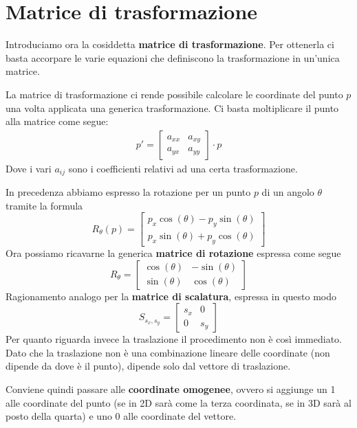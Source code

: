 \section{Matrice di trasformazione}
Introduciamo ora la cosiddetta \textbf{matrice di trasformazione}. Per ottenerla ci basta accorpare le varie equazioni
che definiscono la trasformazione in un'unica matrice.

La matrice di trasformazione ci rende possibile calcolare le coordinate del punto $p$ una volta applicata una generica
trasformazione. Ci basta moltiplicare il punto alla matrice come segue:
\begin{gather*}
	p' = \begin{bmatrix}
		a_{xx} & a_{xy} \\
		a_{yx} & a_{yy}
	\end{bmatrix} \cdot p
\end{gather*}
Dove i vari $a_{ij}$ sono i coefficienti relativi ad una certa trasformazione.

In precedenza abbiamo espresso la rotazione per un punto $p$ di un angolo $\theta$ tramite la formula
\[
	R_\theta(p) = \begin{bmatrix}
		p_x \cos(\theta) - p_y \sin(\theta) \\
		p_x \sin(\theta) + p_y \cos(\theta)
	\end{bmatrix}
\]
Ora possiamo ricavarne la generica \textbf{matrice di rotazione} espressa come segue
\[
	R_\theta = \begin{bmatrix}
		\cos(\theta) & -\sin(\theta) \\
		\sin(\theta) & \cos(\theta)
	\end{bmatrix}
\]
Ragionamento analogo per la \textbf{matrice di scalatura}, espressa in questo modo
\[
	S_{s_x, s_y} = \begin{bmatrix}
		s_x & 0   \\
		0   & s_y
	\end{bmatrix}
\]
Per quanto riguarda invece la traslazione il procedimento non \`e cos\`i immediato. Dato
che la traslazione non \`e una combinazione lineare delle coordinate (non dipende da dove \`e
il punto), dipende solo dal vettore di traslazione.

Conviene quindi passare alle \textbf{coordinate omogenee}, ovvero si aggiunge un 1 alle
coordinate del punto (se in 2D sar\`a come la terza coordinata, se in 3D sar\`a al posto
della quarta) e uno 0 alle coordinate del vettore.

